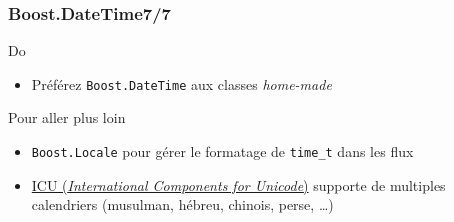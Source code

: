 \documentclass[C++.tex]{subfiles}
\begin{document}
\begin{frame}[fragile]
	\frametitle{Boost.DateTime\titlehfill{}7/7}
	\begin{exampleblock}{Do}
		\begin{itemize}
			\item Préférez \lstinline|Boost.DateTime| aux classes \textit{home-made}
		\end{itemize}
	\end{exampleblock}

	\begin{block}{Pour aller plus loin}
		\begin{itemize}
			\item \lstinline|Boost.Locale| pour gérer le formatage de \lstinline|time_t| dans les flux


			\item \href{http://site.icu-project.org/}{ICU (\textit{International Components for Unicode})} supporte de multiples calendriers (musulman, hébreu, chinois, perse, \ldots)

		\end{itemize}
	\end{block}
\end{frame}
\end{document}
